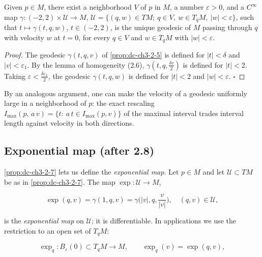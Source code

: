 \begin{proposition}
  \label{prop:dc-ch3-2-7}
  Given $p\in M$, there exist a neighborhood $V$ of $p$ in $M$, a number
  $\varepsilon>0$, and a $C^\infty$ map $\gamma:(-2,2)\times\mathcal{U}\to M$,
  $\mathcal{U}=\{(q,w)\in TM;\ q\in V,\ w\in T_qM,\ |w|<\varepsilon\}$, such that
  $t\mapsto\gamma(t,q,w)$, $t\in(-2,2)$, is the unique geodesic of $M$ passing
  through $q$ with velocity $w$ at $t=0$, for every $q\in V$ and $w\in T_qM$ with
  $|w|<\varepsilon$.
\end{proposition}
\begin{proof}
  The geodesic $\gamma(t,q,v)$ of \cref{prop:dc-ch3-2-5} is defined for
  $|t|<\delta$ and $|v|<\varepsilon_1$. By the lemma of homogeneity (2.6),
  $\gamma(t,q,\frac{\delta v}{2})$ is defined for $|t|<2$. Taking
  $\varepsilon<\frac{\delta\varepsilon_1}{2}$, the geodesic $\gamma(t,q,w)$ is
  defined for $|t|<2$ and $|w|<\varepsilon$. $\square$
\end{proof}

\begin{remark}
  \label{rem:dc-ch3-2-8}
  \leanok
  By an analogous argument, one can make the velocity of a geodesic uniformly large
  in a neighborhood of $p$: the exact rescaling
  $I_{\max}(p,\,a\,v)=\{t:\ a\,t\in I_{\max}(p,v)\}$ of the maximal interval
  trades interval length against velocity in both directions.
\end{remark}

\subsection{Exponential map (after 2.8)}
\cref{prop:dc-ch3-2-7} lets us define the \emph{exponential map}. Let $p\in M$ and let
$\mathcal{U}\subset TM$ be as in \cref{prop:dc-ch3-2-7}. The map $\exp:\mathcal{U}\to M$,

$$
\exp(q,v)=\gamma(1,q,v)=\gamma\Big(|v|,q,\frac{v}{|v|}\Big),\quad(q,v)\in\mathcal{U},
$$

is the \emph{exponential map} on $\mathcal{U}$; it is differentiable. In applications
we use the restriction to an open set of $T_qM$:

$$
\exp_q:B_\varepsilon(0)\subset T_qM\to M,\qquad\exp_q(v)=\exp(q,v),
$$

